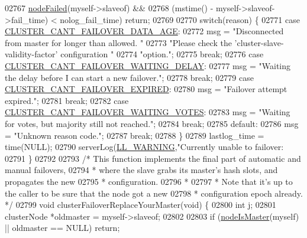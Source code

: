 \begin{DoxyCode}
{{{{{{{{{{{{{{{{{{{{{{{{{{{{{{{{{{{{{{{{{{{{{{{{{{02767         \hyperlink{cluster_8h_a6a31c614ff4f5ac8ebaa630b0a921c3d}{nodeFailed}(myself->slaveof) &&
02768         (mstime() - myself->slaveof->fail\_time) < nolog\_fail\_time) \textcolor{keywordflow}{return};
02769 
02770     \textcolor{keywordflow}{switch}(reason) \{
02771     \textcolor{keywordflow}{case} \hyperlink{cluster_8h_a0ad102e4aecc3451096624e2201f4285}{CLUSTER\_CANT\_FAILOVER\_DATA\_AGE}:
02772         msg = \textcolor{stringliteral}{"Disconnected from master for longer than allowed. "}
02773               \textcolor{stringliteral}{"Please check the 'cluster-slave-validity-factor' configuration "}
02774               \textcolor{stringliteral}{"option."};
02775         \textcolor{keywordflow}{break};
02776     \textcolor{keywordflow}{case} \hyperlink{cluster_8h_a40e58ef928e66a27912835d7e6a1c97a}{CLUSTER\_CANT\_FAILOVER\_WAITING\_DELAY}:
02777         msg = \textcolor{stringliteral}{"Waiting the delay before I can start a new failover."};
02778         \textcolor{keywordflow}{break};
02779     \textcolor{keywordflow}{case} \hyperlink{cluster_8h_af0085657cacf54e82c477680571f7509}{CLUSTER\_CANT\_FAILOVER\_EXPIRED}:
02780         msg = \textcolor{stringliteral}{"Failover attempt expired."};
02781         \textcolor{keywordflow}{break};
02782     \textcolor{keywordflow}{case} \hyperlink{cluster_8h_abaf73be169ccef9db0795134adfd4847}{CLUSTER\_CANT\_FAILOVER\_WAITING\_VOTES}:
02783         msg = \textcolor{stringliteral}{"Waiting for votes, but majority still not reached."};
02784         \textcolor{keywordflow}{break};
02785     \textcolor{keywordflow}{default}:
02786         msg = \textcolor{stringliteral}{"Unknown reason code."};
02787         \textcolor{keywordflow}{break};
02788     \}
02789     lastlog\_time = time(NULL);
02790     serverLog(\hyperlink{server_8h_a31229b9334bba7d6be2a72970967a14b}{LL\_WARNING},\textcolor{stringliteral}{"Currently unable to failover: %
02791 \}
02792 
02793 \textcolor{comment}{/* This function implements the final part of automatic and manual failovers,}
02794 \textcolor{comment}{ * where the slave grabs its master's hash slots, and propagates the new}
02795 \textcolor{comment}{ * configuration.}
02796 \textcolor{comment}{ *}
02797 \textcolor{comment}{ * Note that it's up to the caller to be sure that the node got a new}
02798 \textcolor{comment}{ * configuration epoch already. */}
02799 \textcolor{keywordtype}{void} clusterFailoverReplaceYourMaster(\textcolor{keywordtype}{void}) \{
02800     \textcolor{keywordtype}{int} j;
02801     clusterNode *oldmaster = myself->slaveof;
02802 
02803     \textcolor{keywordflow}{if} (\hyperlink{cluster_8h_a2d8e84269474d8750565fb3fb67aa436}{nodeIsMaster}(myself) || oldmaster == NULL) \textcolor{keywordflow}{return};
}}}}}}}}}}}}}}}}}}}}}}}}}}}}}}}}}}}}}}}}}}}}}}}}}}}
\end{DoxyCode}
